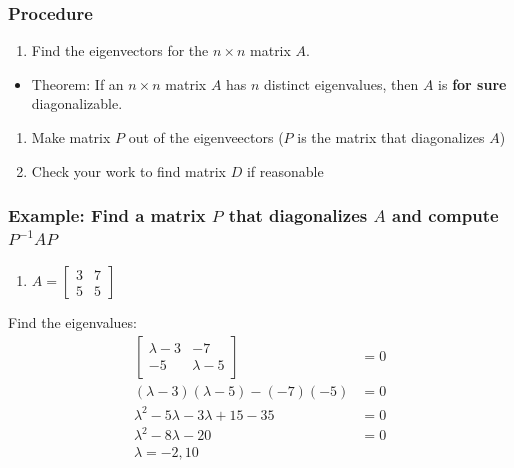 \documentclass[
  letterpaper,
  DIV=11,
  numbers=noendperiod]{scrartcl}
\providecommand{\tightlist}{%
  \setlength{\itemsep}{0pt}\setlength{\parskip}{0pt}}\usepackage{longtable,booktabs,array}
\begin{document}
\hypertarget{procedure}{%
\subsubsection{Procedure}\label{procedure}}

\begin{enumerate}
\def\labelenumi{\arabic{enumi}.}
\tightlist
\item
  Find the eigenvectors for the \(n \times n\) matrix \(A\).
\end{enumerate}

\begin{itemize}
\tightlist
\item
  Theorem: If an \(n \times n\) matrix \(A\) has \(n\) distinct
  eigenvalues, then \(A\) is \textbf{for sure} diagonalizable.
\end{itemize}

\begin{enumerate}
\def\labelenumi{\arabic{enumi}.}
\setcounter{enumi}{1}
\tightlist
\item
  Make matrix \(P\) out of the eigenveectors (\(P\) is the matrix that
  diagonalizes \(A\))
\item
  Check your work to find matrix \(D\) if reasonable
\end{enumerate}

\hypertarget{example-find-a-matrix-p-that-diagonalizes-a-and-compute-p-1ap}{%
\subsubsection{\texorpdfstring{Example: Find a matrix \(P\) that
diagonalizes \(A\) and compute
\(P^{-1}AP\)}{Example: Find a matrix P that diagonalizes A and compute P\^{}\{-1\}AP}}\label{example-find-a-matrix-p-that-diagonalizes-a-and-compute-p-1ap}}

\begin{enumerate}
\def\labelenumi{\arabic{enumi}.}
\tightlist
\item
  \(A = \begin{bmatrix}3 & 7 \\ 5 & 5 \end{bmatrix}\)
\end{enumerate}

Find the eigenvalues: \begin{align*}
\begin{bmatrix}\lambda-3 & -7 \\ -5 & \lambda-5\end{bmatrix} &= 0 \\
(\lambda-3)(\lambda-5)-(-7)(-5) &= 0 \\
\lambda^2-5\lambda-3\lambda+15-35 &= 0 \\
\lambda^2-8\lambda-20 &= 0 \\
\lambda = -2, 10 
\end{align*}
\end{document}
